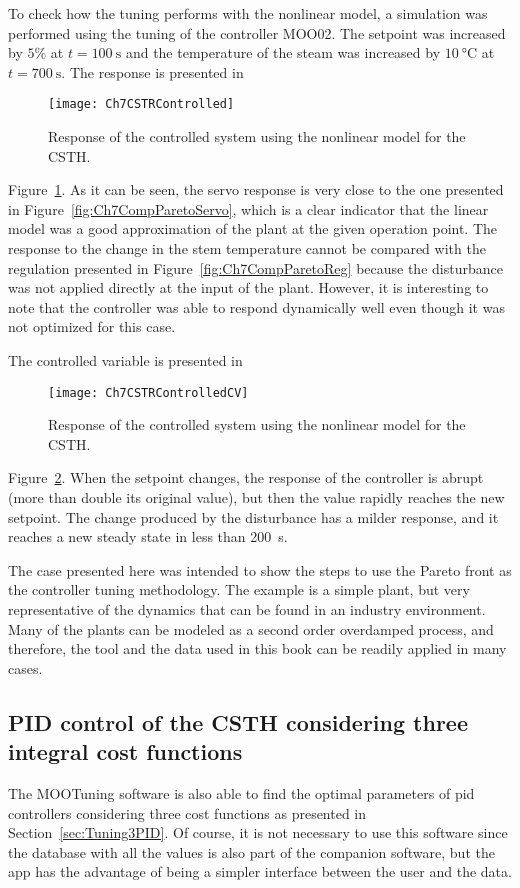 To check how the tuning performs with the nonlinear model, a simulation was performed using the tuning of the controller MOO02. The setpoint was increased by $5\%$ at $t=\SI{100}{\second}$ and the temperature of the steam was increased by $\SI{10}{\celsius}$ at $t=\SI{700}{\second}$. The response is presented in %
\begin{figure}[tb]
	\centering
	\texttt{[image: Ch7CSTRControlled]}
	\caption{Response of the controlled system using the nonlinear model for the CSTH.}
	\label{fig:Ch7CSTRControlled}
\end{figure}
%
Figure~\ref{fig:Ch7CSTRControlled}. As it can be seen, the servo response is very close to the one presented in Figure~\ref{fig:Ch7CompParetoServo}, which is a clear indicator that the linear model was a good approximation of the plant at the given operation point. The response to the change in the stem temperature cannot be compared with the regulation presented in Figure~\ref{fig:Ch7CompParetoReg} because the disturbance was not applied directly at the input of the plant. However, it is interesting to note that the controller was able to respond dynamically well even though it was not optimized for this case.

The controlled variable is presented in %
\begin{figure}[tb]
	\centering
	\texttt{[image: Ch7CSTRControlledCV]}
	\caption{Response of the controlled system using the nonlinear model for the CSTH.}
	\label{fig:Ch7CSTRControlledCV}
\end{figure}
%
Figure~\ref{fig:Ch7CSTRControlledCV}. When the setpoint changes, the response of the controller is abrupt (more than double its original value), but then the value rapidly reaches the new setpoint. The change produced by the disturbance has a milder response, and it reaches a new steady state in less than \SI{200}{\second}.

The case presented here was intended to show the steps to use the Pareto front as the controller tuning methodology. The example is a simple plant, but very representative of the dynamics that can be found in an industry environment. Many of the plants can be modeled as a second order overdamped process, and therefore, the tool and the data used in this book can be readily applied in many cases.

\subsection{PID control of the CSTH considering three integral cost functions}
\label{sec:PIDCSTH3Fun}
The MOOTuning software is also able to find the optimal parameters of \gls{pid} controllers considering three cost functions as presented in Section~\ref{sec:Tuning3PID}. Of course, it is not necessary to use this software since the database with all the values is also part of the companion software, but the \matlab{} app has the advantage of being a simpler interface between the user and the data.

